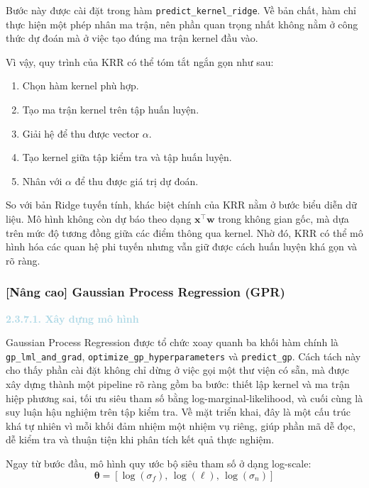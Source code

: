 Bước này được cài đặt trong hàm \texttt{predict\_kernel\_ridge}. Về bản chất, hàm chỉ thực hiện một phép nhân ma trận, nên phần quan trọng nhất không nằm ở công thức dự đoán mà ở việc tạo đúng ma trận kernel đầu vào.

Vì vậy, quy trình của KRR có thể tóm tắt ngắn gọn như sau:
\begin{enumerate}
    \item Chọn hàm kernel phù hợp.
    \item Tạo ma trận kernel trên tập huấn luyện.
    \item Giải hệ để thu được vector $\alpha$.
    \item Tạo kernel giữa tập kiểm tra và tập huấn luyện.
    \item Nhân với $\alpha$ để thu được giá trị dự đoán.
\end{enumerate}

So với bản Ridge tuyến tính, khác biệt chính của KRR nằm ở bước biểu diễn dữ liệu. Mô hình không còn dự báo theo dạng $\mathbf{x}^\top \mathbf{w}$ trong không gian gốc, mà dựa trên mức độ tương đồng giữa các điểm thông qua kernel. Nhờ đó, KRR có thể mô hình hóa các quan hệ phi tuyến nhưng vẫn giữ được cách huấn luyện khá gọn và rõ ràng.

\subsubsection{[Nâng cao] Gaussian Process Regression (GPR)}

\noindent\textcolor{lightblue}{\textbf{2.3.7.1. Xây dựng mô hình}}

Gaussian Process Regression được tổ chức xoay quanh ba khối hàm chính là \texttt{gp\_lml\_and\_grad}, \texttt{optimize\_gp\_hyperparameters} và \texttt{predict\_gp}. Cách tách này cho thấy phần cài đặt không chỉ dừng ở việc gọi một thư viện có sẵn, mà được xây dựng thành một pipeline rõ ràng gồm ba bước: thiết lập kernel và ma trận hiệp phương sai, tối ưu siêu tham số bằng log-marginal-likelihood, và cuối cùng là suy luận hậu nghiệm trên tập kiểm tra. Về mặt triển khai, đây là một cấu trúc khá tự nhiên vì mỗi khối đảm nhiệm một nhiệm vụ riêng, giúp phần mã dễ đọc, dễ kiểm tra và thuận tiện khi phân tích kết quả thực nghiệm.

Ngay từ bước đầu, mô hình quy ước bộ siêu tham số ở dạng log-scale:
\begin{equation}
    \boldsymbol{\theta} = [\log(\sigma_f),\, \log(\ell),\, \log(\sigma_n)]
\end{equation}

